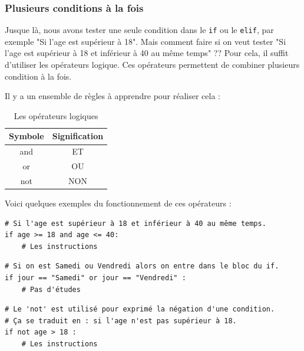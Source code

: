 \documentclass[12pt]{article}
\newcommand{\code}[1]{\colorbox{light-gray}{\texttt{#1}}}
\begin{document}
        \subsubsection{Plusieurs conditions à la fois}
            Jusque là, nous avons tester une seule condition dans le \code{if} ou le \code{elif}, par exemple "Si 
            l'age est supérieur à 18". Mais comment faire si on veut tester "Si l'age est supérieur à 18 et 
            inférieur à 40 au même temps" ??
            Pour cela, il suffit d'utiliser les opérateurs logique. Ces opérateurs permettent de combiner plusieurs 
            condition à la fois.

            Il y a un ensemble de règles à apprendre pour réaliser cela :
            \begin{table}[H]
                \centering
                \begin{tabular}{|c|c|}
                    \hline
                    \textbf{Symbole} & \textbf{Signification} \\
                    \hline
                    and & ET \\
                    \hline
                    or & OU \\
                    \hline
                    not & NON \\
                    \hline
                \end{tabular}
                \caption{Les opérateurs logiques}
            \end{table}

            Voici quelques exemples du fonctionnement de ces opérateurs :
            \begin{lstlisting}[style=code]
# Si l'age est supérieur à 18 et inférieur à 40 au même temps.
if age >= 18 and age <= 40:
    # Les instructions
            \end{lstlisting}

            \begin{lstlisting}[style=code, breaklines=false]
# Si on est Samedi ou Vendredi alors on entre dans le bloc du if.
if jour == "Samedi" or jour == "Vendredi" :
    # Pas d'études
            \end{lstlisting}

            \begin{lstlisting}[style=code]
# Le 'not' est utilisé pour exprimé la négation d'une condition.
# Ça se traduit en : si l'age n'est pas supérieur à 18.
if not age > 18 :
    # Les instructions 
            \end{lstlisting}
\end{document}
